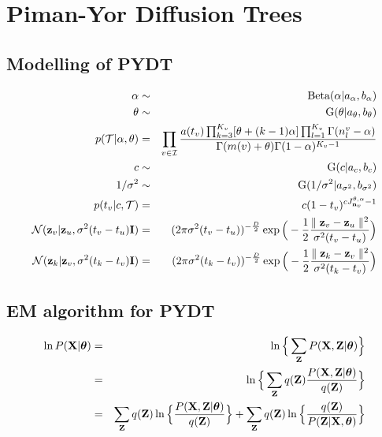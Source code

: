 \documentclass{article}
\begin{document}
\section{Piman-Yor Diffusion Trees}
\subsection{Modelling of PYDT}	

	\begin{eqnarray}
		\alpha &\sim& \textrm{Beta}(\alpha | a_\alpha, b_\alpha) \\ 
		\theta &\sim& \textrm{G}(\theta | a_\theta, b_\theta) \\
		p(\mathcal{T}|\alpha, \theta) &=& \prod_{v \in \mathcal{I}} \frac{a(t_v) \prod^{K_v}_{k=3}[\theta + (k - 1)\alpha] \prod^{K_v}_{l=1} \Gamma(n^v_l - \alpha)}{\Gamma(m(v) + \theta) \Gamma(1 - \alpha)^{K_v - 1}} \\
		c &\sim& \textrm{G}(c | a_c, b_c) \\
		1/\sigma^2 &\sim& \textrm{G}(1/\sigma^2 | a_{\sigma^2}, b_{\sigma^2}) \\
		p(t_v | c, \mathcal{T}) &=& c(1-t_v)^{cJ^{\theta,\alpha}_{\bold{n}_v} - 1} \\
		\mathcal{N}(\bold{z}_v | \bold{z}_u, \sigma^2(t_v - t_u)\bold{I}) &=& (2 \pi \sigma^2(t_v - t_u))^{-\frac{D}{2}} \exp \Big(-\frac{1}{2}\frac{\parallel \bold{z}_v - \bold{z}_u \parallel^2}{\sigma^2 (t_v - t_u)} \Big) \\
		\mathcal{N}(\bold{z}_k | \bold{z}_v, \sigma^2(t_k - t_v)\bold{I}) &=& (2 \pi \sigma^2(t_k - t_v))^{-\frac{D}{2}} \exp \Big(-\frac{1}{2}\frac{\parallel \bold{z}_k - \bold{z}_v \parallel^2}{\sigma^2 (t_k - t_v)} \Big)
	\end{eqnarray}

	\subsection{EM algorithm for PYDT}
	\begin{eqnarray}
		\ln P(\bold{X}|\boldsymbol{\theta}) &=& \ln \Big\{\sum_\bold{Z}P(\bold{X}, \bold{Z} | \boldsymbol{\theta}) \Big\} \nonumber \\
		&=& \ln \Big\{\sum_\bold{Z}q(\bold{Z})\frac{P(\bold{X}, \bold{Z}|\boldsymbol{\theta})}{q(\bold{Z})} \Big\} \nonumber \\
		&=& \sum_\bold{Z}q(\bold{Z})\ln \Big\{ \frac{P(\bold{X}, \bold{Z}| \boldsymbol{\theta})}{q(\bold{Z})} \Big\} + \sum_\bold{Z}q(\bold{Z})\ln \Big\{ \frac{q(\bold{Z})}{P(\bold{Z}|\bold{X}, \boldsymbol{\theta})} \Big\}
	\end{eqnarray}
\end{document}
